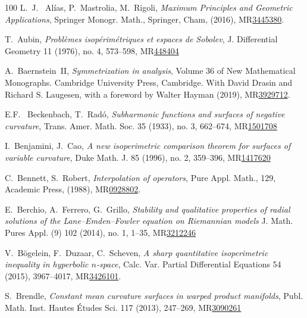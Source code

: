 \documentclass[a4paper,11pt,reqno]{amsart}
\theoremstyle{plain}
\numberwithin{equation}{section} \allowdisplaybreaks
\begin{document}
\noindent 
	
\begin{thebibliography}{100}
 L.~J. ~Al\'ias, P.~Mastrolia, M.~Rigoli,  \textit{Maximum Principles and Geometric Applications}, Springer Monogr. Math., Springer, Cham, (2016), MR\href{https://doi.org/10.1007/978-3-319-24337-5}{3445380}.

 T.~Aubin, \emph{ Probl\`emes isop\'erim\'etriques et espaces de Sobolev}, J. Differential Geometry 11 (1976), no. 4, 573–598, MR\href{http://projecteuclid.org/euclid.jdg/1214433725}{448404}

 A.~Baernstein~II, \textit{Symmetrization in analysis}, Volume 36 of New Mathematical Monographs. Cambridge University Press, Cambridge. With David Drasin and Richard S. Laugesen, with a foreword by Walter Hayman (2019),  MR\href{https://doi.org/10.1017/9781139020244}{3929712}.

 E.F.~ Beckenbach, T.~Rad\'o, \emph{Subharmonic functions and surfaces of negative curvature}, Trans. Amer. Math. Soc. 35 (1933), no. 3, 662–674, MR\href{https://doi.org/10.2307/1989854}{1501708}



 I.~Benjamini, J.~Cao, \emph{A new isoperimetric comparison theorem for surfaces of variable curvature}, Duke Math. J. 85 (1996), no. 2, 359–396, MR\href{https://doi.org/10.1215/S0012-7094-96-08515-4}{1417620}



 C.~Bennett, S.~Robert, \emph{Interpolation of operators}, Pure Appl. Math., 129, Academic Press, (1988), MR\href{https://mathscinet.ams.org/mathscinet/article?mr=928802}{0928802}.

 E.~Berchio, A.~Ferrero, G.~Grillo, \emph{Stability and qualitative properties of radial solutions of the Lane–Emden–Fowler equation on Riemannian models} J. Math. Pures Appl. (9) 102 (2014), no. 1, 1–35, MR\href{https://doi.org/10.1016/j.matpur.2013.10.012}{3212246}

 V.~Bögelein, F.~Duzaar, C.~Scheven, \textit{A sharp quantitative isoperimetric inequality in hyperbolic $n$-space}, Calc. Var. Partial Differential Equations 54 (2015), 3967–4017, MR\href{https://doi.org/10.1007/s00526-015-0928-9}{3426101}.



 S.~Brendle, \emph{ Constant mean curvature surfaces in warped product manifolds}, Publ. Math. Inst. Hautes Études Sci. 117 (2013), 247–269, MR\href{https://doi.org/10.1007/s10240-012-0047-5}{3090261}


\end{thebibliography}
\end{document}
